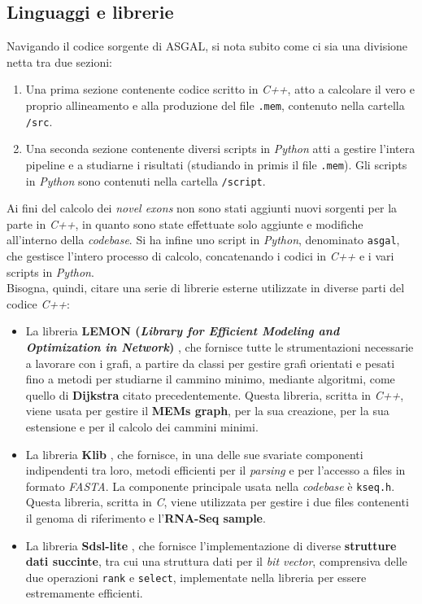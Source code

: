 \documentclass[a4paper,12pt, oneside]{book}
\begin{document}
\subsection{Linguaggi e librerie}
Navigando il codice sorgente di ASGAL, si nota subito come ci sia una divisione
netta tra due sezioni:
\begin{enumerate}
  \item Una prima sezione contenente codice scritto in \textit{C++}, atto a
  calcolare il vero e proprio allineamento e alla produzione del file
  \texttt{.mem}, contenuto nella cartella \texttt{/src}.
  \item Una seconda sezione contenente diversi scripts in \textit{Python} atti a
  gestire l'intera pipeline e a studiarne i risultati (studiando in primis il
  file \texttt{.mem}). Gli scripts in \textit{Python} sono contenuti nella
  cartella \texttt{/script}.
\end{enumerate}
Ai fini del calcolo dei \textit{novel exons} non sono stati aggiunti nuovi
sorgenti per la parte in \textit{C++}, in quanto sono state effettuate solo
aggiunte e modifiche all'interno della \textit{codebase}. Si ha infine uno
script in \textit{Python}, denominato \texttt{asgal}, che gestisce
l'intero processo di calcolo, concatenando i codici in \textit{C++} e i vari
scripts in \textit{Python}.\\ 
Bisogna, quindi, citare una serie di librerie esterne utilizzate in diverse
parti del codice \textit{C++}:
\begin{itemize}
  \item La libreria \textbf{LEMON (\textit{Library for Efficient
      Modeling and Optimization in Network})} \cite{lemon}, che fornisce tutte
  le strumentazioni necessarie a lavorare con i grafi, a partire da classi per
  gestire grafi orientati e pesati fino a metodi per studiarne il cammino
  minimo, mediante algoritmi, come quello di \textbf{Dijkstra} citato
  precedentemente. Questa libreria, scritta in \textit{C++}, viene usata per
  gestire il \textbf{MEMs graph}, per la sua creazione, per la sua estensione e
  per il calcolo dei cammini minimi.
  \item La libreria \textbf{Klib} \cite{klib}, che fornisce, in una delle sue
  svariate componenti indipendenti tra loro, metodi efficienti per
  il \textit{parsing} e per l'accesso a files in formato \textit{FASTA}.
  La componente principale usata nella \textit{codebase} è
  \texttt{kseq.h}. Questa libreria, scritta in  \textit{C}, viene utilizzata
  per gestire i due files contenenti il genoma di riferimento e l'\textbf{RNA-Seq
    sample}.
  \item La libreria \textbf{Sdsl-lite} \cite{sdsl}, che fornisce
  l'implementazione di diverse \textbf{strutture dati succinte}, tra cui una
  struttura dati per il \textit{bit vector}, comprensiva delle due operazioni
  \texttt{rank} e \texttt{select}, implementate nella libreria per essere
  estremamente efficienti. 
\end{itemize}
\end{document}
